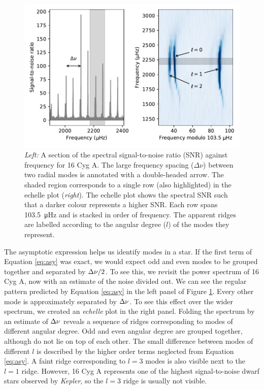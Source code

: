 \begin{figure}[tb]
    \centering
    \includegraphics{figures/seismo-echelle.pdf}
    \caption[Signal-to-noise ratio as a function of frequency and echelle diagram for 16 Cyg A.]{\emph{Left:} A section of the spectral signal-to-noise ratio (SNR) against frequency for 16 Cyg A. The large frequency spacing (\(\Delta\nu\)) between two radial modes is annotated with a double-headed arrow. The shaded region corresponds to a single row (also highlighted) in the echelle plot (\emph{right}). The echelle plot shows the spectral SNR such that a darker colour represents a higher SNR. Each row spans \SI{103.5}{\micro\hertz} and is stacked in order of frequency. The apparent ridges are labelled according to the angular degree (\(l\)) of the modes they represent.}
    \label{fig:seismo-echelle}
\end{figure}

The asymptotic expression helps us identify modes in a star. If the first term of Equation \ref{eq:asy} was exact, we would expect odd and even modes to be grouped together and separated by \({\Delta\nu}/2\). To see this, we revisit the power spectrum of 16 Cyg A, now with an estimate of the noise divided out. We can see the regular pattern predicted by Equation \ref{eq:asy} in the left panel of Figure \ref{fig:seismo-echelle}. Every other mode is approximately separated by \({\Delta\nu}\). To see this effect over the wider spectrum, we created an \emph{echelle} plot in the right panel. Folding the spectrum by an estimate of \({\Delta\nu}\) reveals a sequence of ridges corresponding to modes of different angular degree. Odd and even angular degree are grouped together, although do not lie on top of each other. The small difference between modes of different \(l\) is described by the higher order terms neglected from Equation \ref{eq:asy}. A faint ridge corresponding to \(l=3\) modes is also visible next to the \(l=1\) ridge. However, 16 Cyg A represents one of the highest signal-to-noise dwarf stars observed by \emph{Kepler}, so the \(l=3\) ridge is usually not visible. 

